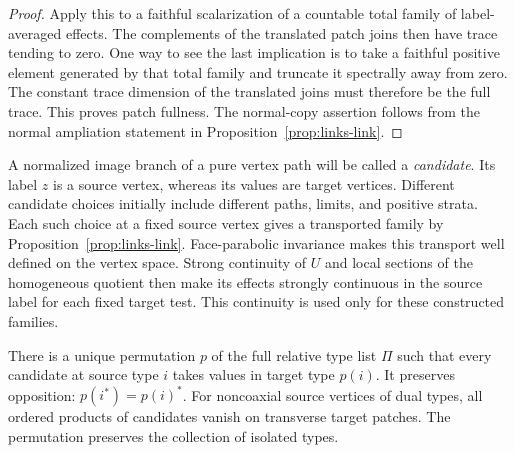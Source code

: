 \begin{proof}
Apply this to a faithful scalarization of a countable total family of
label-averaged effects. The complements of the translated patch joins
then have trace tending to zero. One way to see the last implication
is to take a faithful positive element generated by that total family
and truncate it spectrally away from zero. The constant trace
dimension of the translated joins must therefore be the full trace.
This proves patch fullness. The normal-copy assertion follows from
the normal ampliation statement in Proposition~\ref{prop:links-link}.
\end{proof}

A normalized image branch of a pure vertex path will be called a
\emph{candidate}. Its label $z$ is a source vertex, whereas its values
are target vertices. Different candidate choices initially include
different paths, limits, and positive strata. Each such choice at a
fixed source vertex gives a transported family by
Proposition~\ref{prop:links-link}. Face-parabolic invariance makes
this transport well defined on the vertex space. Strong continuity of
$U$ and local sections of the homogeneous quotient then make its
effects strongly continuous in the source label for each fixed target
test. This continuity is used only for these constructed families.

\begin{proposition}
\label{prop:transfer-types}
There is a unique permutation $p$ of the full relative type list
$\Pi$ such that every candidate at source type $i$ takes values in
target type $p(i)$. It preserves opposition:
$p(i^*)=p(i)^*$. For noncoaxial source vertices of dual types, all
ordered products of candidates vanish on transverse target patches.
The permutation preserves the collection of isolated types.
\end{proposition}

